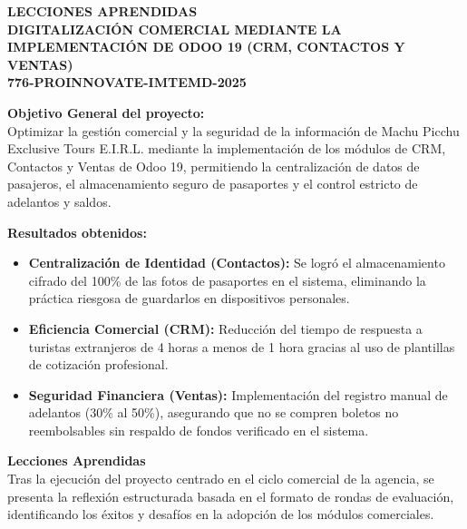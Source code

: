 \documentclass[11pt]{article}
\begin{document}
\begin{center}
    {\Large \textbf{LECCIONES APRENDIDAS}}\\[0.25cm]
    {\Large \textbf{DIGITALIZACI\'ON COMERCIAL MEDIANTE LA IMPLEMENTACI\'ON DE ODOO 19 (CRM, CONTACTOS Y VENTAS)}}\\[0.25cm]
    {\large \textbf{776-PROINNOVATE-IMTEMD-2025}}
\end{center}

\textbf{Objetivo General del proyecto:}\\
Optimizar la gestión comercial y la seguridad de la información de Machu Picchu Exclusive Tours E.I.R.L. mediante la implementación de los módulos de CRM, Contactos y Ventas de Odoo 19, permitiendo la centralización de datos de pasajeros, el almacenamiento seguro de pasaportes y el control estricto de adelantos y saldos.

\textbf{Resultados obtenidos:}
\begin{itemize}
    \item \textbf{Centralización de Identidad (Contactos):} Se logró el almacenamiento cifrado del 100\% de las fotos de pasaportes en el sistema, eliminando la práctica riesgosa de guardarlos en dispositivos personales.
    \item \textbf{Eficiencia Comercial (CRM):} Reducción del tiempo de respuesta a turistas extranjeros de 4 horas a menos de 1 hora gracias al uso de plantillas de cotización profesional.
    \item \textbf{Seguridad Financiera (Ventas):} Implementación del registro manual de adelantos (30\% al 50\%), asegurando que no se compren boletos no reembolsables sin respaldo de fondos verificado en el sistema.
\end{itemize}

\textbf{Lecciones Aprendidas}\\
Tras la ejecución del proyecto centrado en el ciclo comercial de la agencia, se presenta la reflexión estructurada basada en el formato de rondas de evaluación, identificando los éxitos y desafíos en la adopción de los módulos comerciales.
\end{document}
